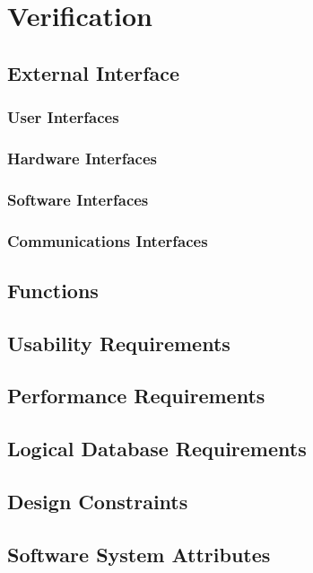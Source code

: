 \documentclass[a4paper, 10pt]{report}
\begin{document}
    \chapter{Verification}
        \section{External Interface}
            \subsection{User Interfaces}
            \subsection{Hardware Interfaces}
            \subsection{Software Interfaces}
            \subsection{Communications Interfaces}
        \section{Functions}
        \section{Usability Requirements}
        \section{Performance Requirements}
        \section{Logical Database Requirements}
        \section{Design Constraints}
        \section{Software System Attributes}
\end{document}

